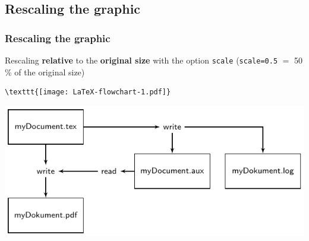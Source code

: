 \subsection{Rescaling the graphic}
\begin{frame}[fragile]
\frametitle{Rescaling the graphic}

Rescaling \textbf{relative} to the \textbf{original size} with the option \lstinline|scale| (\lstinline|scale=0.5| $=$ 50\,\% of the original size)

\begin{lstlisting}
\texttt{[image: LaTeX-flowchart-1.pdf]}  
\end{lstlisting}

\includegraphics[scale=0.5]{../../texfiles-beamer/tex-material/WissArb-latex/LaTeX-flowchart-1.pdf}


\end{frame}


